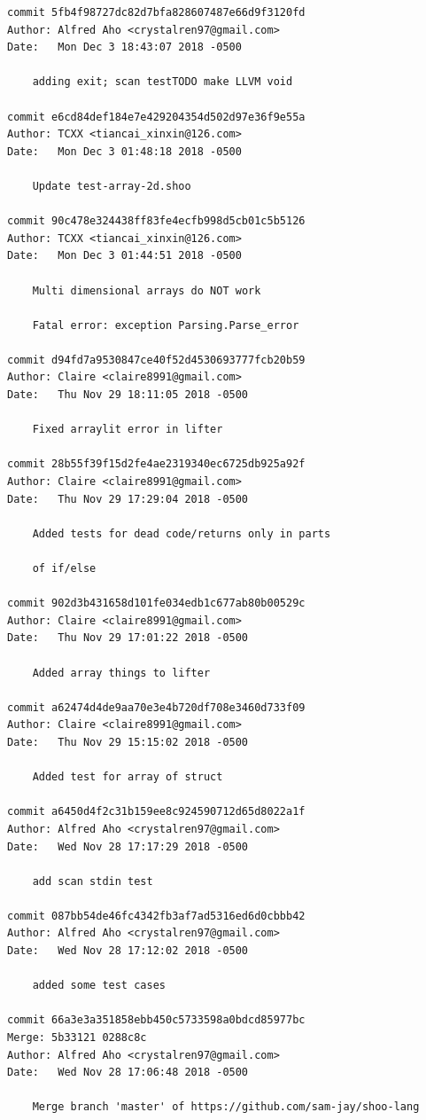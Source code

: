 \documentclass[12pt]{article}
\begin{document}
\begin{lstlisting}
commit 5fb4f98727dc82d7bfa828607487e66d9f3120fd
Author: Alfred Aho <crystalren97@gmail.com>
Date:   Mon Dec 3 18:43:07 2018 -0500

    adding exit; scan testTODO make LLVM void

commit e6cd84def184e7e429204354d502d97e36f9e55a
Author: TCXX <tiancai_xinxin@126.com>
Date:   Mon Dec 3 01:48:18 2018 -0500

    Update test-array-2d.shoo

commit 90c478e324438ff83fe4ecfb998d5cb01c5b5126
Author: TCXX <tiancai_xinxin@126.com>
Date:   Mon Dec 3 01:44:51 2018 -0500

    Multi dimensional arrays do NOT work
    
    Fatal error: exception Parsing.Parse_error

commit d94fd7a9530847ce40f52d4530693777fcb20b59
Author: Claire <claire8991@gmail.com>
Date:   Thu Nov 29 18:11:05 2018 -0500

    Fixed arraylit error in lifter

commit 28b55f39f15d2fe4ae2319340ec6725db925a92f
Author: Claire <claire8991@gmail.com>
Date:   Thu Nov 29 17:29:04 2018 -0500

    Added tests for dead code/returns only in parts
    
    of if/else

commit 902d3b431658d101fe034edb1c677ab80b00529c
Author: Claire <claire8991@gmail.com>
Date:   Thu Nov 29 17:01:22 2018 -0500

    Added array things to lifter

commit a62474d4de9aa70e3e4b720df708e3460d733f09
Author: Claire <claire8991@gmail.com>
Date:   Thu Nov 29 15:15:02 2018 -0500

    Added test for array of struct

commit a6450d4f2c31b159ee8c924590712d65d8022a1f
Author: Alfred Aho <crystalren97@gmail.com>
Date:   Wed Nov 28 17:17:29 2018 -0500

    add scan stdin test

commit 087bb54de46fc4342fb3af7ad5316ed6d0cbbb42
Author: Alfred Aho <crystalren97@gmail.com>
Date:   Wed Nov 28 17:12:02 2018 -0500

    added some test cases

commit 66a3e3a351858ebb450c5733598a0bdcd85977bc
Merge: 5b33121 0288c8c
Author: Alfred Aho <crystalren97@gmail.com>
Date:   Wed Nov 28 17:06:48 2018 -0500

    Merge branch 'master' of https://github.com/sam-jay/shoo-lang


\end{lstlisting}
\end{document}
